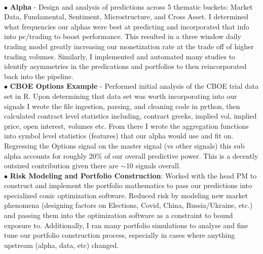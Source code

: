 \documentclass[a4paper,20pt]{article}
\begin{document}
               { \\$\bullet$ \textbf{Alpha} - Design and analysis of predictions across 5 thematic buckets: Market Data, Fundamental, Sentiment, Microstructure, and
                 Cross Asset. I determined what frequencies our alphas were best at predicting and incorporated that info into pc/trading to boost performance.
                 This resulted in a three window daily trading model greatly increasing our monetization rate at the trade off of higher trading volumes.
                 Similarly, I implemented and automated many studies to identify asymmetries in the predications and portfolios to then reincorporated back into the pipeline.
                 \\$\bullet$ \textbf{CBOE Options Example} - Performed initial analysis of the CBOE trial data set in R. Upon determining that data set was worth
                 incorporating into our signals I wrote the file ingestion, parsing, and cleaning code in python, then calculated contract level statistics including, contract greeks,
                 implied vol, implied price, open interest, volumes etc. From there I wrote the aggregation functions into symbol level statistics (features) that our alpha would use and fit on.
                 Regressing the Options signal on the master signal (vs other signals) this sub alpha accounts for roughly 20$\%$ of our overall predictive power. This is a
                 decently outsized contribution given there are $\sim$10 signals overall.
                 \\$\bullet$ \textbf{Risk Modeling and Portfolio Construction}: Worked with the head PM to construct and implement the portfolio mathematics
                 to pass our predictions into specialized conic optimization software. Reduced risk by modeling new market phenomena (designing factors on Elections, Covid, China, Russia/Ukraine, etc.) and passing them
                 into the optimization software as a constraint to bound exposure to. Additionally, I ran many portfolio simulations to analyse and fine tune our portfolio construction process,
                 especially in cases where anything upstream (alpha, data, etc) changed.
               }
\end{document}
